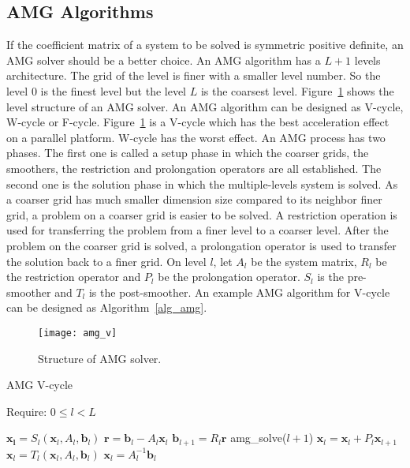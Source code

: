 \documentclass[runningheads,a4paper]{llncs}
\newcommand{\vect}[1]{\boldsymbol{#1}}
\begin{document}
{\begin{algorithm}[!htb]
\begin{algorithmic}[1]
\end{algorithmic}
\end{algorithm}


\subsection{AMG Algorithms}

If the coefficient matrix of a system to be solved is symmetric positive definite, an AMG solver should be a better choice. An AMG algorithm has a $L + 1$ levels architecture. The grid of the level is finer with a smaller level number. So the level 0 is the finest level but the level $L$ is the coarsest level. Figure~\ref{fig_amg} shows the level structure of an AMG solver. An AMG algorithm can be designed as V-cycle, W-cycle or F-cycle. Figure~\ref{fig_amg} is a V-cycle which has the best acceleration effect on a parallel platform. W-cycle has the worst effect. An AMG process has two phases. The first one is called a setup phase in which the coarser grids, the smoothers, the restriction and prolongation operators are all established. The second one is the solution phase in which the multiple-levels system is solved. As a coarser grid has much smaller dimension size compared to its neighbor finer grid, a problem on a coarser grid is easier to be solved. A restriction operation is used for transferring the problem from a finer level to a coarser level. After the problem on the coarser grid is solved, a prolongation operator is used to transfer the solution back to a finer grid. On level $l$, let $A_l$ be the system matrix, $R_l$ be the restriction operator and $P_l$ be the prolongation operator. $S_l$ is the pre-smoother and $T_l$ is the post-smoother. An example AMG algorithm for V-cycle can be designed as Algorithm~\ref{alg_amg}.

\begin{figure}[tbh]
    \centering
    \texttt{[image: amg\_v]}
    \caption{Structure of AMG solver.}
    \label{fig_amg}
\end{figure}

\begin{algorithm}\caption{AMG V-cycle}
\label{alg_amg}
\begin{algorithmic}\State Require: $0 \leq l < L$
\State

  \State $\vect{x_l} = S_l(\vect{x}_l, A_l, \vect{b}_l)$                                
  \State $\vect{r} = \vect{b}_l - A_l\vect{x}_l$
  \State ${\vect{b}_{l+1}} = R_l\vect{r}$                                               
  \State amg\_solve($l+1$)                                                              
  \State $\vect{x}_l = \vect{x}_l + P_l \vect{x}_{l+1}$                                 
  \State $\vect{x}_l = T_l(\vect{x}_l, A_l, \vect{b}_l)$                                
\Else
  \State $\vect{x}_l = A_l^{-1}\vect{b}_l$
\EndIf


\end{algorithmic}
\end{algorithm}}
\end{document}
